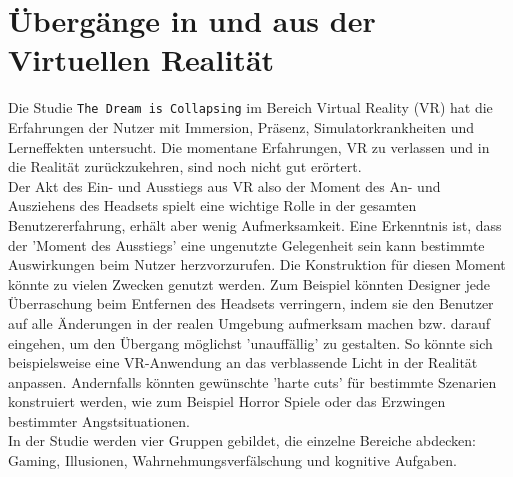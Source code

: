 \section{Übergänge in und aus der Virtuellen Realität}\label{sec:relatedWork.vr}


Die Studie \texttt{The Dream is Collapsing} im Bereich Virtual Reality (VR) hat die Erfahrungen der Nutzer mit Immersion, Präsenz, Simulatorkrankheiten und Lerneffekten untersucht. Die momentane Erfahrungen, VR zu verlassen und in die Realität zurückzukehren, sind noch nicht gut erörtert.\\
Der Akt des Ein- und Ausstiegs aus VR also der Moment des An- und Ausziehens des Headsets spielt eine wichtige Rolle in der gesamten Benutzererfahrung, erhält aber wenig Aufmerksamkeit. Eine Erkenntnis ist, dass der 'Moment des Ausstiegs' eine ungenutzte Gelegenheit sein kann bestimmte Auswirkungen beim Nutzer herzvorzurufen. Die Konstruktion für diesen Moment könnte zu vielen Zwecken genutzt werden. Zum Beispiel könnten Designer jede Überraschung beim Entfernen des Headsets verringern, indem sie den Benutzer auf alle Änderungen in der realen Umgebung aufmerksam machen bzw. darauf eingehen, um den Übergang möglichst 'unauffällig' zu gestalten. So könnte sich beispielsweise eine VR-Anwendung an das verblassende Licht in der Realität anpassen.
Andernfalls könnten gewünschte 'harte cuts' für bestimmte Szenarien konstruiert werden, wie zum Beispiel Horror Spiele oder das Erzwingen bestimmter Angstsituationen.\\
In der Studie werden vier Gruppen gebildet, die einzelne Bereiche abdecken: Gaming, Illusionen, Wahrnehmungsverfälschung und kognitive Aufgaben. \\

